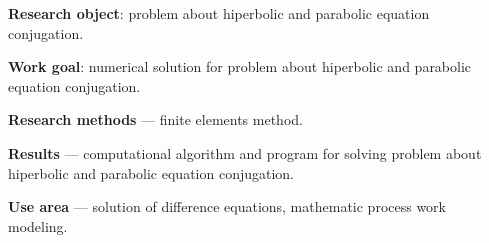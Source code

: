 \textbf{Research object}: problem about hiperbolic and parabolic equation \\conjugation.

\textbf{Work goal}: numerical solution for problem about hiperbolic and parabolic equation conjugation.

\textbf{Research methods} --- finite elements method.

\textbf{Results} --- computational algorithm and program for solving problem about hiperbolic
and parabolic equation conjugation.

\textbf{Use area} --- solution of difference equations, mathematic process work \\ modeling.
